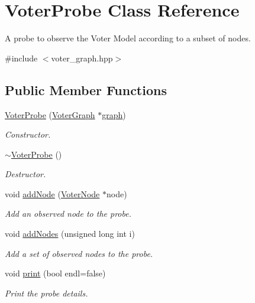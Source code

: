 \hypertarget{class_voter_probe}{}\section{Voter\+Probe Class Reference}
\label{class_voter_probe}


A probe to observe the Voter Model according to a subset of nodes.  




{\ttfamily \#include $<$voter\+\_\+graph.\+hpp$>$}

\subsection*{Public Member Functions}
\begin{DoxyCompactItemize}
\item 
\hyperlink{class_voter_probe_a589eba6cb211385f334b2cad33c7b591}{Voter\+Probe} (\hyperlink{class_voter_graph}{Voter\+Graph} $\ast$\hyperlink{class_voter_probe_add099ac2ac20a5f6a0e3616e78639497}{graph})
\begin{DoxyCompactList}\small\item\em Constructor. \end{DoxyCompactList}\item 
\hypertarget{class_voter_probe_a13ddd0051f730aa8c5b4c1487ace3e16}{}\hyperlink{class_voter_probe_a13ddd0051f730aa8c5b4c1487ace3e16}{$\sim$\+Voter\+Probe} ()\label{class_voter_probe_a13ddd0051f730aa8c5b4c1487ace3e16}

\begin{DoxyCompactList}\small\item\em Destructor. \end{DoxyCompactList}\item 
void \hyperlink{class_voter_probe_a102e61e3d43b00622f56e746b50aadcb}{add\+Node} (\hyperlink{class_voter_node}{Voter\+Node} $\ast$node)
\begin{DoxyCompactList}\small\item\em Add an observed node to the probe. \end{DoxyCompactList}\item 
void \hyperlink{class_voter_probe_a3833f42ffe18c150a127b2c98ff742fe}{add\+Nodes} (unsigned long int i)
\begin{DoxyCompactList}\small\item\em Add a set of observed nodes to the probe. \end{DoxyCompactList}\item 
void \hyperlink{class_voter_probe_a73936d4b0b00748cf43e6ec852183f84}{print} (bool endl=false)
\begin{DoxyCompactList}\small\item\em Print the probe details. \end{DoxyCompactList}\end{DoxyCompactItemize}
